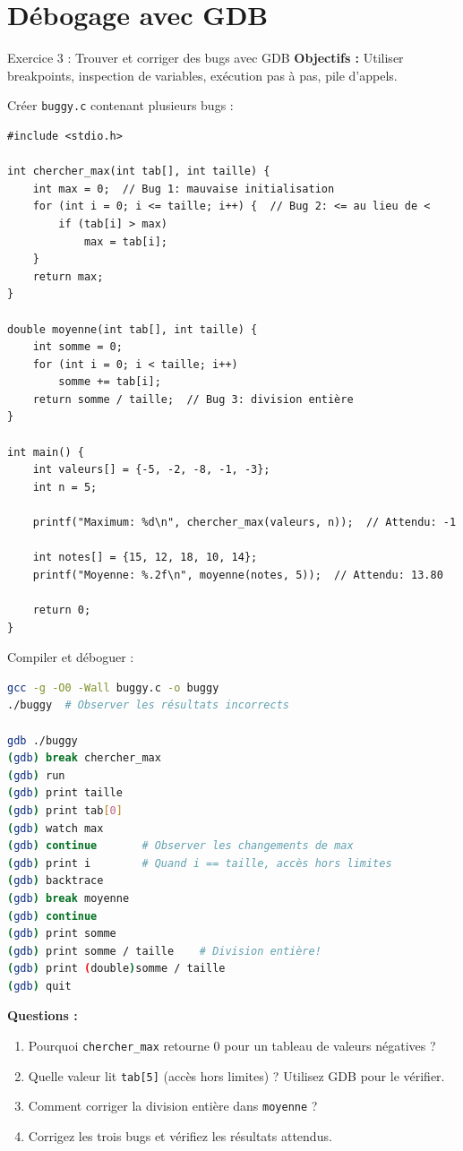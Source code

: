 \documentclass[10pt,a4paper]{article}
\begin{document}
\section{Débogage avec GDB}

\begin{exercicebox}{Exercice 3 : Trouver et corriger des bugs avec GDB}
\textbf{Objectifs :} Utiliser breakpoints, inspection de variables, exécution pas à pas, pile d'appels.

Créer \texttt{buggy.c} contenant plusieurs bugs :
\begin{lstlisting}
#include <stdio.h>

int chercher_max(int tab[], int taille) {
    int max = 0;  // Bug 1: mauvaise initialisation
    for (int i = 0; i <= taille; i++) {  // Bug 2: <= au lieu de <
        if (tab[i] > max)
            max = tab[i];
    }
    return max;
}

double moyenne(int tab[], int taille) {
    int somme = 0;
    for (int i = 0; i < taille; i++)
        somme += tab[i];
    return somme / taille;  // Bug 3: division entière
}

int main() {
    int valeurs[] = {-5, -2, -8, -1, -3};
    int n = 5;
    
    printf("Maximum: %d\n", chercher_max(valeurs, n));  // Attendu: -1
    
    int notes[] = {15, 12, 18, 10, 14};
    printf("Moyenne: %.2f\n", moyenne(notes, 5));  // Attendu: 13.80
    
    return 0;
}
\end{lstlisting}

Compiler et déboguer :
\begin{lstlisting}[language=bash]
gcc -g -O0 -Wall buggy.c -o buggy
./buggy  # Observer les résultats incorrects

gdb ./buggy
(gdb) break chercher_max
(gdb) run
(gdb) print taille
(gdb) print tab[0]
(gdb) watch max
(gdb) continue       # Observer les changements de max
(gdb) print i        # Quand i == taille, accès hors limites
(gdb) backtrace
(gdb) break moyenne
(gdb) continue
(gdb) print somme
(gdb) print somme / taille    # Division entière!
(gdb) print (double)somme / taille
(gdb) quit
\end{lstlisting}

\textbf{Questions :}
\begin{enumerate}
\item Pourquoi \texttt{chercher\_max} retourne 0 pour un tableau de valeurs négatives ?
\item Quelle valeur lit \texttt{tab[5]} (accès hors limites) ? Utilisez GDB pour le vérifier.
\item Comment corriger la division entière dans \texttt{moyenne} ?
\item Corrigez les trois bugs et vérifiez les résultats attendus.
\end{enumerate}
\end{exercicebox}
\end{document}
